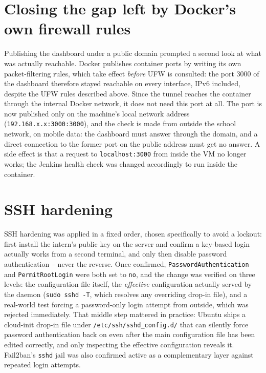 \section{Closing the gap left by Docker's own firewall rules}
Publishing the dashboard under a public domain prompted a second look at what was actually reachable. Docker publishes container ports by writing its own packet-filtering rules, which take effect \emph{before} UFW is consulted: the port 3000 of the dashboard therefore stayed reachable on every interface, IPv6 included, despite the UFW rules described above. Since the tunnel reaches the container through the internal Docker network, it does not need this port at all. The port is now published only on the machine's local network address (\texttt{192.168.x.x:3000:3000}), and the check is made from outside the school network, on mobile data: the dashboard must answer through the domain, and a direct connection to the former port on the public address must get no answer. A side effect is that a request to \texttt{localhost:3000} from inside the VM no longer works; the Jenkins health check was changed accordingly to run inside the container.

\section{SSH hardening}
SSH hardening was applied in a fixed order, chosen specifically to avoid a lockout: first install the intern's public key on the server and confirm a key-based login actually works from a second terminal, and only then disable password authentication -- never the reverse. Once confirmed, \texttt{PasswordAuthentication} and \texttt{PermitRootLogin} were both set to \texttt{no}, and the change was verified on three levels: the configuration file itself, the \emph{effective} configuration actually served by the daemon (\texttt{sudo sshd -T}, which resolves any overriding drop-in file), and a real-world test forcing a password-only login attempt from outside, which was rejected immediately. That middle step mattered in practice: Ubuntu ships a cloud-init drop-in file under \texttt{/etc/ssh/sshd\_config.d/} that can silently force password authentication back on even after the main configuration file has been edited correctly, and only inspecting the effective configuration reveals it. Fail2ban's \texttt{sshd} jail was also confirmed active as a complementary layer against repeated login attempts.

